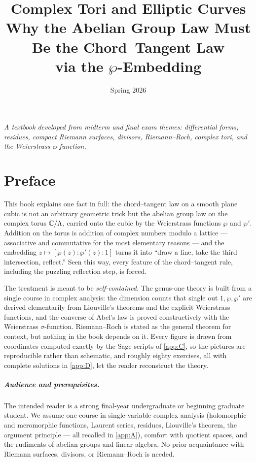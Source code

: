 \documentclass[11pt]{book}
\title{Complex Tori and Elliptic Curves\\
\large Why the Abelian Group Law Must Be the Chord--Tangent Law\\
via the $\wp$-Embedding}
\author{}
\date{Spring 2026}
\begin{document}
\frontmatter
\maketitle

\begin{center}
\emph{A textbook developed from midterm and final exam themes:
differential forms, residues, compact Riemann surfaces, divisors,
Riemann--Roch, complex tori, and the Weierstrass $\wp$-function.}
\end{center}

\chapter*{Preface}

This book explains one fact in full: the chord--tangent law on a smooth plane
cubic is not an arbitrary geometric trick but the abelian group law on the complex
torus $\mathbb{C}/\Lambda$, carried onto the cubic by the Weierstrass functions $\wp$ and
$\wp'$. Addition on the torus is addition of complex numbers modulo a lattice ---
associative and commutative for the most elementary reasons --- and the embedding
$z \mapsto [\wp(z):\wp'(z):1]$ turns it into ``draw a line, take the third
intersection, reflect.'' Seen this way, every feature of the chord--tangent rule,
including the puzzling reflection step, is forced.

The treatment is meant to be \emph{self-contained}. The genus-one theory is built
from a single course in complex analysis: the dimension counts that single out
$1, \wp, \wp'$ are derived elementarily from Liouville's theorems and the explicit
Weierstrass functions, and the converse of Abel's law is proved constructively
with the Weierstrass $\sigma$-function. Riemann--Roch is stated as the general
theorem for context, but nothing in the book depends on it. Every figure is drawn
from coordinates computed exactly by the Sage scripts of \cref{app:C}, so the
pictures are reproducible rather than schematic, and roughly eighty exercises, all
with complete solutions in \cref{app:D}, let the reader reconstruct the theory.

\paragraph{Audience and prerequisites.}
The intended reader is a strong final-year undergraduate or beginning graduate
student. We assume one course in single-variable complex analysis (holomorphic and
meromorphic functions, Laurent series, residues, Liouville's theorem, the argument
principle --- all recalled in \cref{app:A}), comfort with quotient spaces, and the
rudiments of abelian groups and linear algebra. No prior acquaintance with Riemann
surfaces, divisors, or Riemann--Roch is needed.
\end{document}
